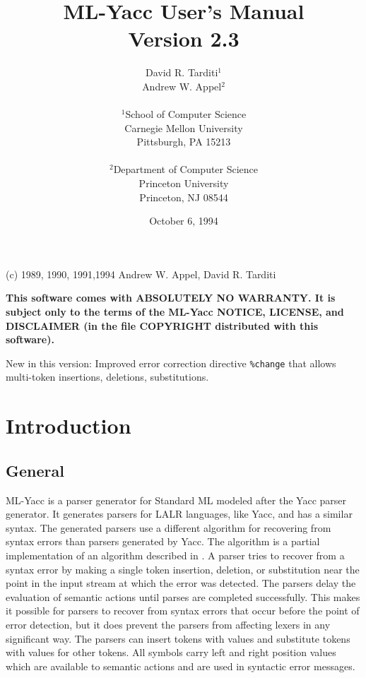 \title{                        ML-Yacc User's Manual \\
			       Version 2.3
      }
\author{                David R. Tarditi$^1$\\
                        Andrew W. Appel$^2$\\
\\              
$^1$School of Computer Science \\
Carnegie Mellon University \\
Pittsburgh, PA 15213 \\
\\
$^2$Department of Computer Science \\
    Princeton University \\
    Princeton, NJ 08544 
}
\date{October 6, 1994}


\maketitle
\begin{center}
(c) 1989, 1990, 1991,1994 Andrew W. Appel, David R. Tarditi
\end{center}

{\bf
This software comes with ABSOLUTELY NO WARRANTY.  It is subject only to
the terms of the ML-Yacc NOTICE, LICENSE, and DISCLAIMER (in the
file COPYRIGHT distributed with this software).
}

New in this version:  Improved error correction directive \verb|%change|
that allows multi-token insertions, deletions, substitutions.

\newpage
\tableofcontents
\newpage

\section{Introduction}
\subsection{General}
ML-Yacc is a parser generator for Standard ML modeled after the
Yacc parser generator.  It generates parsers for LALR languages, like Yacc,
and has a similar syntax.  The generated parsers use a different algorithm 
for recovering from syntax errors than parsers generated by Yacc.  
The algorithm is a partial implementation of an algorithm described in \cite{bf}.
A parser tries to recover from a syntax error
by making a single token insertion, deletion, or
substitution near the point in the input stream at which the error
was detected.  The parsers delay the evaluation of semantic actions until
parses are completed successfully.  This makes it possible for
parsers to recover from syntax errors that occur before the point
of error detection, but it does prevent the parsers from
affecting lexers in any significant way.  The parsers
can insert tokens with values and substitute tokens with values
for other tokens. All symbols carry left and right position values
which are available to semantic actions and are used in
syntactic error messages.

